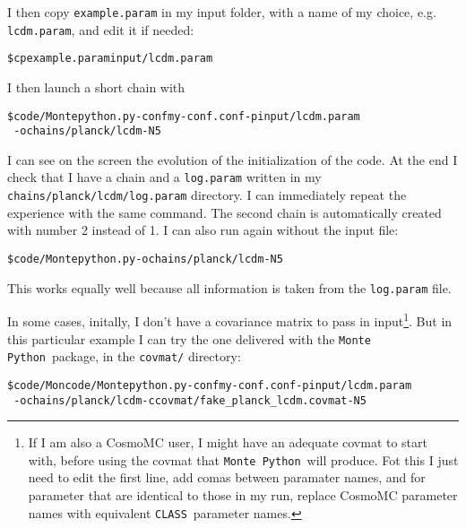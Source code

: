 \documentclass[10pt]{article}
\newcommand{\CLASS}{\texttt{CLASS}}
\newcommand{\MP}{\texttt{Monte Python}}
\begin{document}
I then copy \verb?example.param? in my input folder, with a name of my choice, e.g. \verb?lcdm.param?, and edit it if needed:
\begin{alltt}
\$ cp example.param input/lcdm.param
\end{alltt}
I then launch a short chain with
 \begin{alltt}
\$ code/Montepython.py -conf my-conf.conf -p input/lcdm.param\\ \mbox{    }-o chains/planck/lcdm -N 5
\end{alltt}
I can see on the screen the evolution of the initialization of the code. At the end I check that I have a 
chain and a \verb?log.param? written in my \verb?chains/planck/lcdm/log.param? directory. I can immediately repeat the experience with the same command. The second chain is automatically created with number 2 instead of 1. I can also run again without the input file:
\begin{alltt}
\$ code/Montepython.py -o chains/planck/lcdm -N 5
\end{alltt}
This works equally well because all information is taken from the \verb?log.param? file.

In some cases, initally, I don't have a covariance matrix to pass in
input\footnote{If I am also a CosmoMC user, I might have an adequate covmat to
start with, before using the covmat that \MP~will produce. Fot this I just need
to edit the first line, add comas between paramater names, and for parameter
that are identical to those in my run, replace CosmoMC parameter names with
equivalent \CLASS~parameter names.}. But in this particular example I can try
the one delivered with the \MP~package, in the \verb?covmat/? directory:
\begin{alltt}
  \$ code/Moncode/Montepython.py -conf my-conf.conf -p input/lcdm.param\\ \mbox{    } -o chains/planck/lcdm -c covmat/fake_planck_lcdm.covmat -N 5
\end{alltt}

\end{document}
